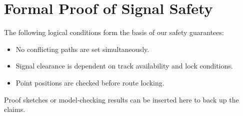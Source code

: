 \section*{Formal Proof of Signal Safety}
The following logical conditions form the basis of our safety guarantees:
\begin{itemize}
  \item No conflicting paths are set simultaneously.
  \item Signal clearance is dependent on track availability and lock conditions.
  \item Point positions are checked before route locking.
\end{itemize}

Proof sketches or model-checking results can be inserted here to back up the claims.
